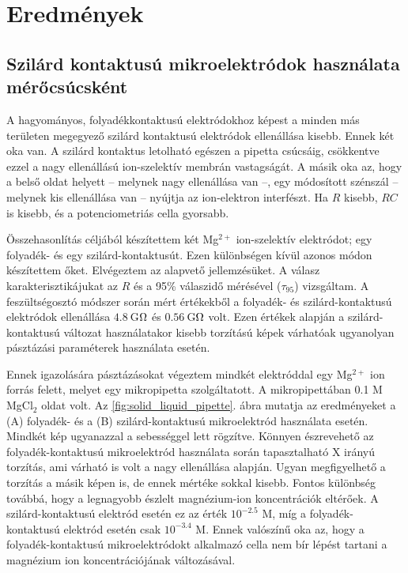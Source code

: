 \section{Eredmények}
\subsection{Szilárd kontaktusú mikroelektródok használata mérőcsúcsként}
A hagyományos, folyadékkontaktusú elektródokhoz képest a minden más területen megegyező szilárd kontaktusú elektródok ellenállása kisebb.
Ennek két oka van.
A szilárd kontaktus letolható egészen a pipetta csúcsáig, csökkentve ezzel a nagy ellenállású ion-szelektív membrán vastagságát.
A másik oka az, hogy a belső oldat helyett -- melynek nagy ellenállása van --, egy módosított szénszál -- melynek kis ellenállása van -- nyújtja az ion-elektron interfészt.
Ha $R$ kisebb, $RC$ is kisebb, és a potenciometriás cella gyorsabb.

Összehasonlítás céljából készítettem két Mg$^{2+}$ ion-szelektív elektródot; egy fo\-lya\-dék- és egy szilárd-kon\-tak\-tu\-sút.
Ezen különbségen kívül azonos módon készítettem őket.
Elvégeztem az alapvető jellemzésüket.
A válasz karakterisztikájukat az $R$ és a 95\% válaszidő mérésével ($\tau_{95}$) vizsgáltam.
A feszültségosztó módszer során mért értékekből a folyadék- és szilárd-kontaktusú elektródok ellenállása $4.8~$G$\ohm$ és $0.56~$G$\ohm$ volt.
Ezen értékek alapján a szilárd-kontaktusú változat használatakor kisebb torzítású képek várhatóak ugyanolyan pásztázási paraméterek használata esetén.

Ennek igazolására pásztázásokat végeztem mindkét elektróddal egy Mg$^{2+}$ ion forrás felett, melyet egy mikropipetta szolgáltatott.
A mikropipettában 0.1 M MgCl$_2$ oldat volt.
Az \ref{fig:solid_liquid_pipette}. ábra mutatja az eredményeket a (A) folyadék- és a (B) szilárd-kontaktusú mikroelektród használata esetén.
Mindkét kép ugyanazzal a sebességgel lett rögzítve.
Könnyen észrevehető az folyadék-kontaktusú mikroelektród használata során tapasztalható X irányú torzítás, ami várható is volt a nagy ellenállása alapján.
Ugyan megfigyelhető a torzítás a másik képen is, de ennek mértéke sokkal kisebb.
Fontos különbség továbbá, hogy a legnagyobb észlelt magnézium-ion koncentrációk eltérőek.
A szilárd-kontaktusú elektród esetén ez az érték $10^{-2.5}$ M, míg a folyadék-kontaktusú elektród esetén csak $10^{-3.4}$ M.
Ennek valószínű oka az, hogy a folyadék-kontaktusú mikroelektródokt alkalmazó cella nem bír lépést tartani a magnézium ion koncentrációjának változásával.

